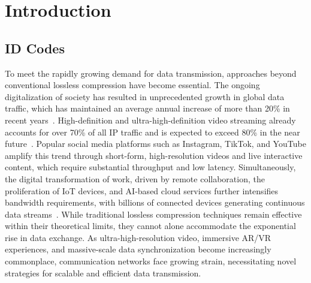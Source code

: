 \documentclass[english,BCOR=4mm,cdfont=false]{tudscrreprt} %
\begin{document}
\chapter{Introduction}

\section{ID Codes}
\label{sec:idCode}
To meet the rapidly growing demand for data transmission, approaches beyond conventional lossless compression have become essential.
The ongoing digitalization of society has resulted in unprecedented growth in global data traffic, which has maintained an average annual increase of more than 20\% in recent years~\cite{cisco2023annual}. High-definition and ultra-high-definition video streaming already accounts for over 70\% of all IP traffic and is expected to exceed 80\% in the near future~\cite{cisco2018vni}. Popular social media platforms such as Instagram, TikTok, and YouTube amplify this trend through short-form, high-resolution videos and live interactive content, which require substantial throughput and low latency. Simultaneously, the digital transformation of work, driven by remote collaboration, the proliferation of IoT devices, and AI-based cloud services further intensifies bandwidth requirements, with billions of connected devices generating continuous data streams~\cite{edgeoptic2024traffic}.
While traditional lossless compression techniques remain effective within their theoretical limits, they cannot alone accommodate the exponential rise in data exchange. As ultra-high-resolution video, immersive AR/VR experiences, and massive-scale data synchronization become increasingly commonplace, communication networks face growing strain, necessitating novel strategies for scalable and efficient data transmission.
\end{document}
